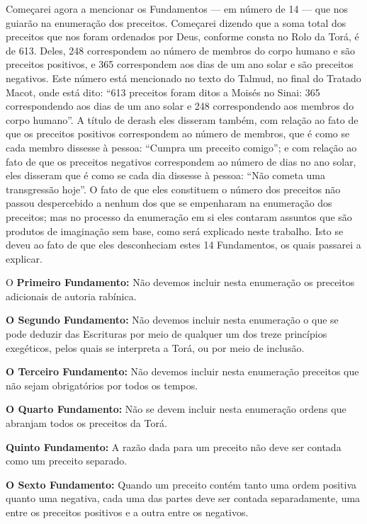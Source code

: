 Começarei agora a mencionar os Fundamentos --- em número de 14 ---
que nos guiarão na enumeração dos preceitos. Começarei dizendo que a
soma total dos preceitos que nos foram ordenados por Deus, conforme
consta no Rolo da Torá\starr, é de 613. Deles,
248 correspondem ao número de membros do corpo
humano e são preceitos positivos, e 365
correspondem aos dias de um ano solar e são preceitos negativos. Este
número está mencionado no texto do Talmud\starr, no final do Tratado Macot\starr,
onde está dito: ``613 preceitos foram ditos a Moisés no
Sinai: 365 correspondendo aos dias de um ano
solar e 248 correspondendo aos membros do corpo
humano''. A título de derash\starr{} eles disseram
também, com relação ao fato de que os preceitos positivos correspondem
ao número de membros, que é como se cada membro dissesse à pessoa:
``Cumpra um preceito comigo''; e com relação ao fato de que os
preceitos negativos correspondem ao número de dias no ano solar, eles
disseram que é como se cada dia dissesse à pessoa: ``Não cometa uma
transgressão hoje''. O fato de que eles constituem o número dos
preceitos não passou despercebido a nenhum dos que se empenharam na
enumeração dos preceitos; mas no processo da enumeração em si eles
contaram assuntos que são produtos de imaginação sem base, como será
explicado neste trabalho. Isto se deveu ao fato de que eles
desconheciam estes 14 Fundamentos, os quais passarei a explicar.

O \textbf{Primeiro Fundamento:} Não devemos incluir nesta enumeração os
preceitos adicionais de autoria rabínica.

\textbf{O Segundo Fundamento:} Não devemos incluir nesta enumeração o
que se pode deduzir das Escrituras por meio de qualquer um dos treze
princípios exegéticos, pelos quais se interpreta a Torá\starr, ou por meio
de inclusão.

\textbf{O Terceiro Fundamento:} Não devemos incluir nesta enumeração
preceitos que não sejam obrigatórios por todos os tempos.

\textbf{O Quarto Fundamento:} Não se devem incluir nesta enumeração
ordens que abranjam todos os preceitos da Torá\starr.

\textbf{Quinto Fundamento:} A razão dada para um preceito não deve ser
contada como um preceito separado.

\textbf{O Sexto Fundamento:} Quando um preceito contém tanto uma ordem
positiva quanto uma negativa, cada uma das partes deve ser contada
separadamente, uma entre os preceitos positivos e a outra entre os
negativos.

